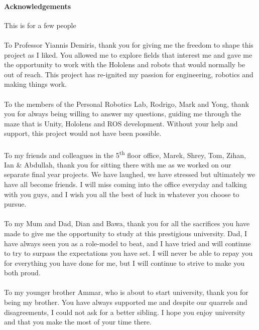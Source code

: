 \newpage

\paragraph{Acknowledgements} This is for a few people

\paragraph{}To Professor Yiannis Demiris, thank you for giving me the freedom to shape this project as I liked. You allowed me to explore fields that interest me and gave me the opportunity to work with the Hololens and robots that would normally be out of reach. This project has re-ignited my passion for engineering, robotics and making things work.

\paragraph{}To the members of the Personal Robotics Lab, Rodrigo, Mark and Yong, thank you for always being willing to answer my questions, guiding me through the maze that is Unity, Hololens and ROS development. Without your help and support, this project would not have been possible.

\paragraph{}To my friends and colleagues in the 5\textsuperscript{th} floor office, Marek, Shrey, Tom, Zihan, Ian \& Abdullah, thank you for sitting there with me as we worked on our separate final year projects. We have laughed, we have stressed but ultimately we have all become friends. I will miss coming into the office everyday and talking with you guys, and I wish you all the best of luck in whatever you choose to pursue.

\paragraph{}To my Mum and Dad, Dian and Bawa, thank you for all the sacrifices you have made to give me the opportunity to study at this prestigious university. Dad, I have always seen you as a role-model to beat, and I have tried and will continue to try to surpass the expectations you have set. I will never be able to repay you for everything you have done for me, but I will continue to strive to make you both proud.

\paragraph{}To my younger brother Ammar, who is about to start university, thank you for being my brother. You have always supported me and despite our quarrels and disagreements, I could not ask for a better sibling. I hope you enjoy university and that you make the most of your time there.

